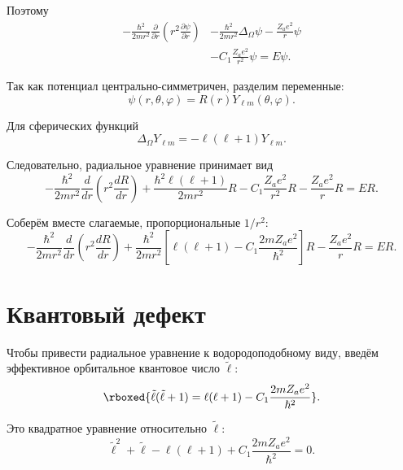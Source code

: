 \documentclass[../final.tex]{subfiles}
\begin{document}
Поэтому
\begin{align*}
    -\frac{\hbar^2}{2mr^2}
    \frac{\partial}{\partial r}
    \left(
        r^2\frac{\partial\psi}{\partial r}
    \right)
    &-
    \frac{\hbar^2}{2mr^2}
    \Delta_\Omega\psi
    -
    \frac{Z_a e^2}{r}\psi
    \\
    &-
    C_1\frac{Z_a e^2}{r^2}\psi
    =
    E\psi.
\end{align*}

Так как потенциал центрально-симметричен, разделим переменные:
\begin{equation*}
    \psi(r,\theta,\varphi)
    =
    R(r)Y_{\ell m}(\theta,\varphi).
\end{equation*}

Для сферических функций
\begin{equation*}
    \Delta_\Omega Y_{\ell m}
    =
    -\ell(\ell+1)Y_{\ell m}.
\end{equation*}

Следовательно, радиальное уравнение принимает вид
\begin{equation*}
    -\frac{\hbar^2}{2mr^2}
    \frac{d}{dr}
    \left(
        r^2\frac{dR}{dr}
    \right)
    +
    \frac{\hbar^2\ell(\ell+1)}{2mr^2}R
    -
    C_1\frac{Z_a e^2}{r^2}R
    -
    \frac{Z_a e^2}{r}R
    =
    ER.
\end{equation*}

Соберём вместе слагаемые, пропорциональные \(1/r^2\):
\begin{equation*}
    -\frac{\hbar^2}{2mr^2}
    \frac{d}{dr}
    \left(
        r^2\frac{dR}{dr}
    \right)
    +
    \frac{\hbar^2}{2mr^2}
    \left[
        \ell(\ell+1)
        -
        C_1\frac{2mZ_a e^2}{\hbar^2}
    \right]R-
    \frac{Z_a e^2}{r}R
    =
    ER.
\end{equation*}

\section{Квантовый дефект}

Чтобы привести радиальное уравнение к водородоподобному виду,
введём эффективное орбитальное квантовое число \(\tilde\ell\):
\begin{equation*}
    \rboxed{
        \tilde\ell(\tilde\ell+1)
        =
        \ell(\ell+1)
        -
        C_1\frac{2mZ_a e^2}{\hbar^2}
    }.
\end{equation*}

Это квадратное уравнение относительно \(\tilde\ell\):
\begin{equation*}
    \tilde\ell^2+\tilde\ell
    -
    \ell(\ell+1)
    +
    C_1\frac{2mZ_a e^2}{\hbar^2}
    =
    0.
\end{equation*}
\end{document}
